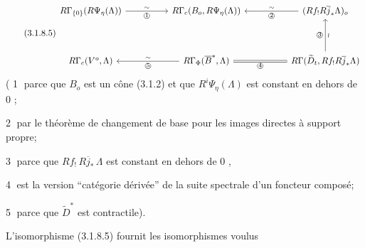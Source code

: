 \begin{equation}\tag{3.1.8.5}
\begin{tikzcd}[column sep=huge, row sep=huge]
R\Gamma_{\{0\}}(R\Psi_\eta(\Lambda)) \arrow[r, "\sim", "\text{\textcircled{1}}"'] & R\Gamma_c(B_o, R\Psi_\eta(\Lambda)) & (Rf_! R\overline{j}_* \Lambda)_o \arrow[l, "\sim"', "\text{\textcircled{2}}"] \\
R\Gamma_c(V^o, \Lambda) & R\Gamma_\Phi(\overline{B}^*, \Lambda) \arrow[l, "\sim"', "\text{\textcircled{5}}"] \arrow[r, equal, "\text{\textcircled{4}}"'] & R\Gamma(\widetilde{D}_t, Rf_! R\overline{j}_* \Lambda) \arrow[u, "\text{\textcircled{3}}", "\wr"']
\end{tikzcd}
\end{equation}
( \textcircled{1} parce que $B_o$ est un cône (3.1.2) et que $R^i\Psi_\eta(\Lambda)$ est constant en dehors de $0$ ;

\textcircled{2} par le théorème de changement de base pour les images directes à support propre;

\textcircled{3} parce que $Rf_! \, R\overline{j}_* \, \Lambda$ est constant en dehors de $0$ ,

\textcircled{4} est la version ``catégorie dérivée'' de la suite spectrale d'un foncteur composé;

\textcircled{5} parce que $\widetilde{D}^*$ est contractile).

L'isomorphisme (3.1.8.5) fournit les isomorphismes voulus 


